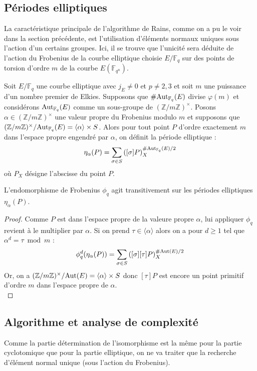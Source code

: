 \documentclass[a4paper]{article} %
\numberwithin{section}{part}
\numberwithin{equation}{section}
\newcommand\zmodninv[1]{(\mathbb{Z}/#1\mathbb{Z})^{\times}}
\newcommand\GF[1]{\mathbb{F}_{#1}}
\newcommand\groupgen[1]{\langle{#1}\rangle}
\begin{document}
\subsection{Périodes elliptiques}
\label{sec:perell}
La caractéristique principale de l'algorithme de Rains, comme on a pu le voir
dans la section précédente, est l'utilisation d'éléments normaux uniques sous
l'action d'un certains groupes. Ici, il se trouve que l'unicité sera déduite de
l'action du Frobenius de la courbe elliptique choisie $E/\GF{q}$ sur des points
de torsion d'ordre $m$ de la courbe $E(\GF{q^n})$.
\begin{defn}
Soit $E/\GF{q}$ une courbe elliptique avec $j_E\neq0$ et $p\neq2, 3$ et soit $m$
une puissance d'un nombre premier de Elkies. Supposons que
$\#\textup{Aut}_{\GF{q}}(E)$ divise $\varphi(m)$ et considérons
$\textup{Aut}_{\GF{q}}(E)$ comme un sous-groupe de $\zmodninv{m}$. Posons
$\alpha\in\zmodninv{m}$ une valeur propre du Frobenius modulo $m$ et supposons
que $\zmodninv{m}/\textup{Aut}_{\GF{q}}(E) = \groupgen{\alpha}\times S$. Alors
pour tout point $P$ d'ordre exactement $m$ dans l'espace propre engendré par
$\alpha$, on définit la période elliptique :
\begin{equation}
\eta_{\alpha}(P) = \sum_{\sigma\in S}
{\left([\sigma]P\right)_X^{\#\textup{Aut}_{\GF{q}}(E)/2}}
\end{equation}
où $P_X$ désigne l'abscisse du point $P$.
\end{defn}
\begin{prop}
L'endomorphisme de Frobenius $\phi_q$ agit transitivement sur les périodes 
elliptiques $\eta_{\alpha}(P)$.
\end{prop}
\begin{proof}
Comme $P$ est dans l'espace propre de la valeure propre $\alpha$, lui appliquer 
$\phi_q$ revient à le multiplier par $\alpha$. Si on prend 
$\tau\in\groupgen{\alpha}$ alors on a pour $d\geq1$ tel que $\alpha^d = \tau 
\bmod m$ :
\begin{equation}
\phi_q^d(\eta_{\alpha}(P)) = \sum_{\sigma\in
S}{\left([\sigma][\tau]P\right)_X^{\#\textup{Aut}(E)/2}}
\end{equation}
Or, on a $\zmodninv{m}/\textup{Aut}(E) = \groupgen{\alpha} \times S$ donc
$[\tau]P$ est encore un point primitif d'ordre $m$ dans l'espace propre de 
$\alpha$.\\
\end{proof}
\subsection{Algorithme et analyse de complexité}
\label{sec:algcompell}
Comme la partie détermination de l'isomorphisme est la même pour la partie
cyclotomique que pour la partie elliptique, on ne va traiter que la recherche
d'élément normal unique (sous l'action du Frobenius).\par
\end{document}
